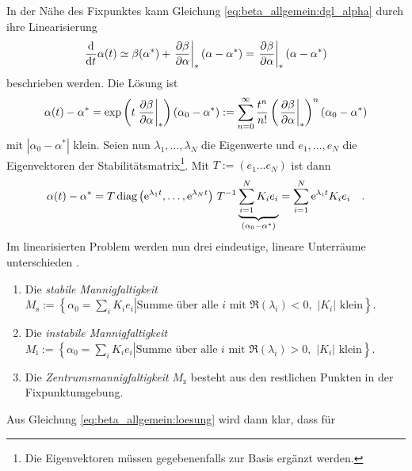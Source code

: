     In der Nähe des Fixpunktes kann Gleichung \eqref{eq:beta_allgemein:dgl_alpha} durch ihre 
    Linearisierung
    \begin{equation}
     \frac{\text{d}}{\text{d} t} \alpha(t) \simeq \beta(\alpha^*) + \left.\frac{\partial \beta}{\partial \alpha}\right|_* (\alpha-\alpha^*) 
     = \left.\frac{\partial \beta}{\partial \alpha}\right|_* (\alpha-\alpha^*)   
     \label{eq:beta_allgemein:beta_linear}
    \end{equation}
    beschrieben werden. Die Lösung ist 
    \begin{equation}
    \alpha(t)-\alpha^* = \exp \left(t \left.\frac{\partial \beta}{\partial \alpha}\right|_* \right) (\alpha_0-\alpha^*) := \sum\limits_{n=0}^\infty \frac{t^n}{n!}
     \left(\left.\frac{\partial \beta}{\partial \alpha}\right|_*\right)^n (\alpha_0-\alpha^*)
    \end{equation}
    mit $|\alpha_0-\alpha^*|$ klein. Seien nun $\lambda_1,\ldots,\lambda_N$ die Eigenwerte und 
    $e_1,\ldots,e_N$ die Eigenvektoren der Stabilitätsmatrix\footnote{Die Eigenvektoren 
    müssen gegebenenfalls zur Basis ergänzt werden.}. Mit $T:=(e_1 \dots e_N)$ ist dann 
    \begin{equation}
     \alpha(t)-\alpha^* = T \, \text{diag}\left(\text{e}^{\lambda_1 t},\ldots, \text{e}^{\lambda_N t}\right) \, T^{-1} 
     \underbrace{\sum\limits_{i=1}^N K_i e_i }_{(\alpha_0-\alpha^*)} = \sum\limits_{i=1}^N
     \text{e}^{\lambda_i t} K_i e_i \quad . \label{eq:beta_allgemein:loesung}
    \end{equation}
    Im linearisierten Problem werden nun drei eindeutige, lineare Unterräume unterschieden 
    \cite{Bronstein}.
    \begin{definition}
     \begin{enumerate}
      \item Die \textit{stabile Mannigfaltigkeit} \\$M_\text{s}:=\left\{\left.\alpha_0=
      \sum\limits_i K_i e_i\right|\text{Summe über alle $i$ mit } \Re (\lambda_i) <0,\text{
       $|K_i|$ klein}
      \right\}$.
      \item Die \textit{instabile Mannigfaltigkeit} \\$M_\text{i}:=\left\{\left.\alpha_0=
      \sum\limits_i K_i e_i\right|\text{Summe über alle $i$ mit }\Re (\lambda_i) >0,\text{
       $|K_i|$ klein}\right\}$.
      \item Die \textit{Zentrumsmannigfaltigkeit} $M_\text{z}$ besteht aus den restlichen 
      Punkten in der Fix\-punkt\-um\-ge\-bung.
      \end{enumerate}
    \end{definition}
    Aus Gleichung \eqref{eq:beta_allgemein:loesung} wird dann klar, dass für  


    

    



      


  
  
  
  
